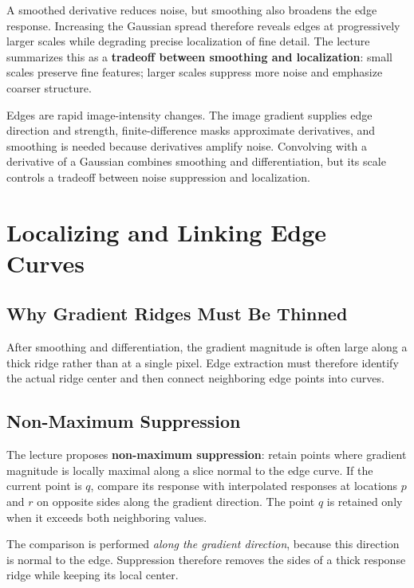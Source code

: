 \documentclass[11pt,a4paper,oneside]{report}
\begin{document}
A smoothed derivative reduces noise, but smoothing also broadens the edge response. Increasing the Gaussian spread therefore reveals edges at progressively larger scales while degrading precise localization of fine detail. The lecture summarizes this as a \textbf{tradeoff between smoothing and localization}: small scales preserve fine features; larger scales suppress more noise and emphasize coarser structure.

\begin{chaptersummary}
Edges are rapid image-intensity changes. The image gradient supplies edge direction and strength, finite-difference masks approximate derivatives, and smoothing is needed because derivatives amplify noise. Convolving with a derivative of a Gaussian combines smoothing and differentiation, but its scale controls a tradeoff between noise suppression and localization.
\end{chaptersummary}

\chapter{Localizing and Linking Edge Curves}

\section{Why Gradient Ridges Must Be Thinned}

After smoothing and differentiation, the gradient magnitude is often large along a thick ridge rather than at a single pixel. Edge extraction must therefore identify the actual ridge center and then connect neighboring edge points into curves.

\section{Non-Maximum Suppression}

The lecture proposes \textbf{non-maximum suppression}: retain points where gradient magnitude is locally maximal along a slice normal to the edge curve. If the current point is $q$, compare its response with interpolated responses at locations $p$ and $r$ on opposite sides along the gradient direction. The point $q$ is retained only when it exceeds both neighboring values.

\begin{keyconcept}
The comparison is performed \emph{along the gradient direction}, because this direction is normal to the edge. Suppression therefore removes the sides of a thick response ridge while keeping its local center.
\end{keyconcept}
\end{document}
